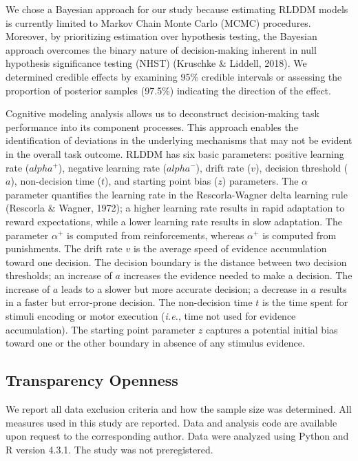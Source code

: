 \documentclass[
  man,floatsintext]{apa6}
\begin{document}
We chose a Bayesian approach for our study because estimating RLDDM models is currently limited to Markov Chain Monte Carlo (MCMC) procedures. Moreover, by prioritizing estimation over hypothesis testing, the Bayesian approach overcomes the binary nature of decision-making inherent in null hypothesis significance testing (NHST) (Kruschke \& Liddell, 2018). We determined credible effects by examining 95\% credible intervals or assessing the proportion of posterior samples (97.5\%) indicating the direction of the effect.

Cognitive modeling analysis allows us to deconstruct decision-making task performance into its component processes. This approach enables the identification of deviations in the underlying mechanisms that may not be evident in the overall task outcome. RLDDM has six basic parameters: positive learning rate (\(alpha^+\)), negative learning rate (\(alpha^-\)), drift rate (\(v\)), decision threshold (\(a\)), non-decision time (\(t\)), and starting point bias (\(z\)) parameters. The \(\alpha\) parameter quantifies the learning rate in the Rescorla-Wagner delta learning rule (Rescorla \& Wagner, 1972); a higher learning rate results in rapid adaptation to reward expectations, while a lower learning rate results in slow adaptation. The parameter \(\alpha^+\) is computed from reinforcements, whereas \(\alpha^+\) is computed from punishments. The drift rate \(v\) is the average speed of evidence accumulation toward one decision. The decision boundary is the distance between two decision thresholds; an increase of \(a\) increases the evidence needed to make a decision. The increase of \(a\) leads to a slower but more accurate decision; a decrease in \(a\) results in a faster but error-prone decision. The non-decision time \(t\) is the time spent for stimuli encoding or motor execution (\emph{i.e.}, time not used for evidence accumulation). The starting point parameter \(z\) captures a potential initial bias toward one or the other boundary in absence of any stimulus evidence.

\hypertarget{transparency-openness}{%
\subsection{Transparency Openness}\label{transparency-openness}}

We report all data exclusion criteria and how the sample size was determined. All measures used in this study are reported. Data and analysis code are available upon request to the corresponding author. Data were analyzed using Python and R version 4.3.1. The study was not preregistered.
\end{document}
